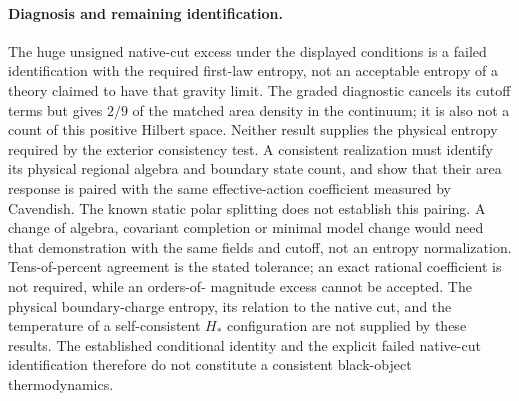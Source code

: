 \documentclass[10pt]{article}
\begin{document}
\paragraph{Diagnosis and remaining identification.}
The huge unsigned native-cut excess under the displayed conditions is a
failed identification with the required first-law entropy, not an
acceptable entropy of a theory claimed to have that gravity limit.
The graded diagnostic cancels its cutoff terms but gives $2/9$ of
the matched area density in the continuum; it is also not a count
of this positive Hilbert space. Neither result supplies the physical
entropy required by the exterior consistency test. A consistent
realization must identify its physical regional algebra and boundary
state count, and show that their area response is paired with the
same effective-action coefficient measured by Cavendish. The known
static polar splitting does not establish this pairing. A change of
algebra, covariant completion or minimal model change would need
that demonstration with the same fields and cutoff, not an entropy
normalization. Tens-of-percent agreement is the stated tolerance;
an exact rational coefficient is not required, while an orders-of-
magnitude excess cannot be accepted.
The physical boundary-charge entropy, its relation to the native
cut, and the temperature of a self-consistent $H_*$ configuration
are not supplied by these results. The established conditional
identity and the explicit failed native-cut identification therefore
do not constitute a consistent black-object thermodynamics.
\end{document}
